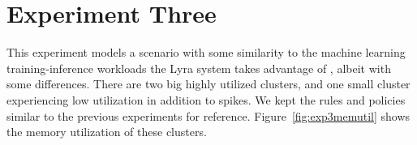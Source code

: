 \section{Experiment Three}
\vspace{2em}
\begin{center}
\end{center}

This experiment models a scenario with some similarity to the machine learning
training-inference workloads the Lyra system takes advantage of
\cite{li_lyra_2023}, albeit with some differences. There are two big highly
utilized clusters, and one small cluster experiencing low utilization in
addition to spikes. We kept the rules and policies similar to the previous
experiments for reference. Figure~\ref{fig:exp3memutil} shows the memory utilization of
these clusters. 

